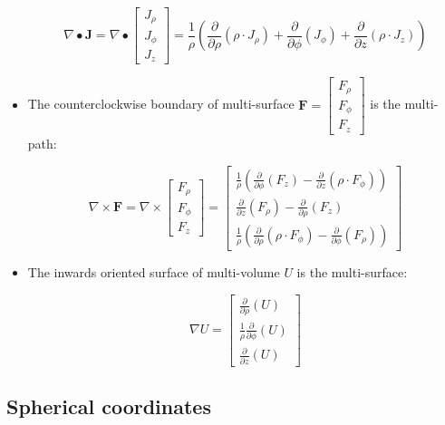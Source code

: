 \documentclass{book}
\begin{document}
\begin{itemize}
\[\nabla \bullet \mathbf{J} = \nabla \bullet \begin{bmatrix} J_\rho \\ J_\phi \\ J_z \end{bmatrix} = \frac{1}{\rho}\left(\frac{\partial}{\partial \rho}(\rho \cdot J_\rho) + \frac{\partial}{\partial \phi}(J_\phi) + \frac{\partial}{\partial z}(\rho \cdot J_z)\right)\]
\item The counterclockwise boundary of multi-surface \(\mathbf{F} = \begin{bmatrix} F_\rho \\ F_\phi \\ F_z \end{bmatrix}\) is the multi-path:

\[\nabla \times \mathbf{F} = \nabla \times \begin{bmatrix} F_\rho \\ F_\phi \\ F_z \end{bmatrix} = \begin{bmatrix} \frac{1}{\rho}\left(\frac{\partial}{\partial \phi}(F_z) - \frac{\partial}{\partial z}(\rho \cdot F_\phi) \right) \\ \frac{\partial}{\partial z}(F_\rho) - \frac{\partial}{\partial \rho}(F_z) \\ \frac{1}{\rho}\left(\frac{\partial}{\partial \rho}(\rho \cdot F_\phi) - \frac{\partial}{\partial \phi}(F_\rho)\right) \end{bmatrix}\]
\item The inwards oriented surface of multi-volume \(U\) is the multi-surface:

\[\nabla U = \begin{bmatrix} \frac{\partial}{\partial \rho}(U) \\ \frac{1}{\rho}\frac{\partial}{\partial \phi}(U) \\ \frac{\partial}{\partial z}(U) \end{bmatrix}\]
\end{itemize}




\subsection*{Spherical coordinates}
\end{document}
